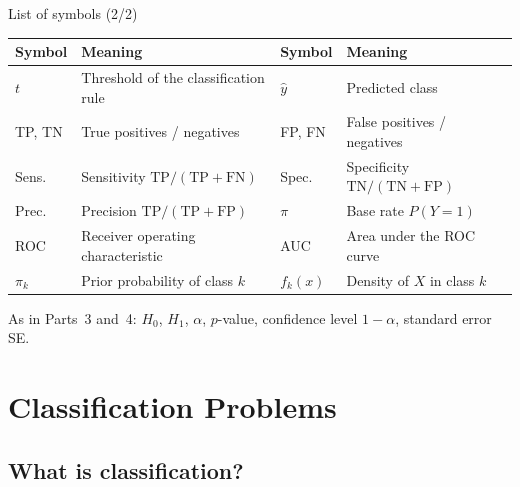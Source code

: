 \documentclass[aspectratio=169,11pt]{beamer}
\begin{document}
\begin{frame}{List of symbols (2/2)}
  \begin{center}
    \small
    \renewcommand{\arraystretch}{1.15}
    \begin{tabular}{@{}lp{5.6cm}lp{4.6cm}@{}}
      \toprule
      \textbf{Symbol} & \textbf{Meaning} & \textbf{Symbol} & \textbf{Meaning} \\
      \midrule
      $t$ & Threshold of the classification rule & $\hat y$ & Predicted class \\
      TP, TN & True positives / negatives & FP, FN & False positives / negatives \\
      Sens. & Sensitivity $\mathrm{TP}/(\mathrm{TP}+\mathrm{FN})$ & Spec. & Specificity $\mathrm{TN}/(\mathrm{TN}+\mathrm{FP})$ \\
      Prec. & Precision $\mathrm{TP}/(\mathrm{TP}+\mathrm{FP})$ & $\pi$ & Base rate $P(Y=1)$ \\
      ROC & Receiver operating characteristic & AUC & Area under the ROC curve \\
      $\pi_k$ & Prior probability of class $k$ & $f_k(x)$ & Density of $X$ in class $k$ \\
      \bottomrule
    \end{tabular}
  \end{center}
  \begin{center}
    \footnotesize As in Parts~3 and~4: $H_0$, $H_1$, $\alpha$, $p$-value,
    confidence level $1-\alpha$, standard error SE.
  \end{center}
\end{frame}

\section[Problem]{Classification Problems}

\subsection{What is classification?}
\end{document}
